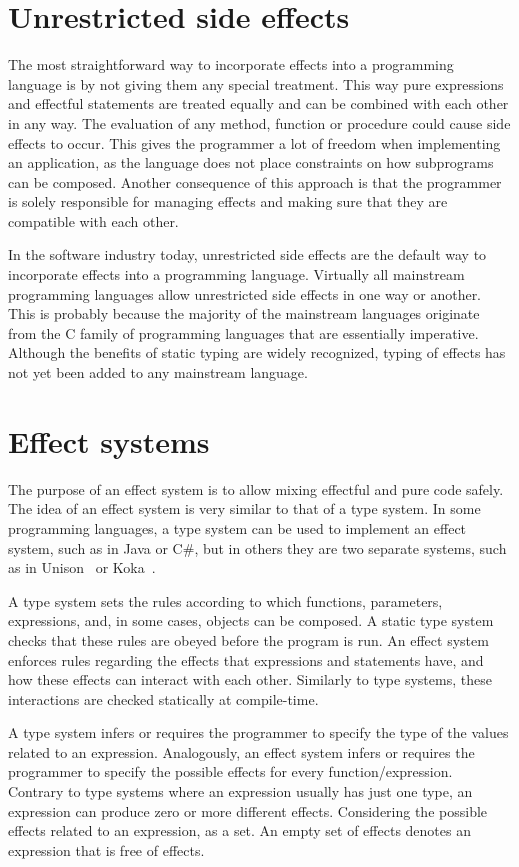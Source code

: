 \section{Unrestricted side effects}
The most straightforward way to incorporate effects into a programming language is by not giving them any special treatment. This way pure expressions and effectful statements are treated equally and can be combined with each other in any way. The evaluation of any method, function or procedure could cause side effects to occur. This gives the programmer a lot of freedom when implementing an application, as the language does not place constraints on how subprograms can be composed. Another consequence of this approach is that the programmer is solely responsible for managing effects and making sure that they are compatible with each other.

In the software industry today, unrestricted side effects are the default way to incorporate effects into a programming language. Virtually all mainstream programming languages allow unrestricted side effects in one way or another. This is probably because the majority of the mainstream languages originate from the C family of programming languages that are essentially imperative. Although the benefits of static typing are widely recognized, typing of effects has not yet been added to any mainstream language.


\section{Effect systems}\label{effects:effect-systems}
The purpose of an effect system is to allow mixing effectful and pure code safely. The idea of an effect system is very similar to that of a type system. In some programming languages, a type system can be used to implement an effect system, such as in Java or C\#, but in others they are two separate systems, such as in Unison~\cite{unison-lang} or Koka~\cite{koka-lang}.

A type system sets the rules according to which functions, parameters, expressions, and, in some cases, objects can be composed. A static type system checks that these rules are obeyed before the program is run. An effect system enforces rules regarding the effects that expressions and statements have, and how these effects can interact with each other. Similarly to type systems, these interactions are checked statically at compile-time.

A type system infers or requires the programmer to specify the type of the values related to an expression. Analogously, an effect system infers or requires the programmer to specify the possible effects for every function/expression. Contrary to type systems where an expression usually has just one type, an expression can produce zero or more different effects. Considering the possible effects related to an expression, as a set. An empty set of effects denotes an expression that is free of effects.

